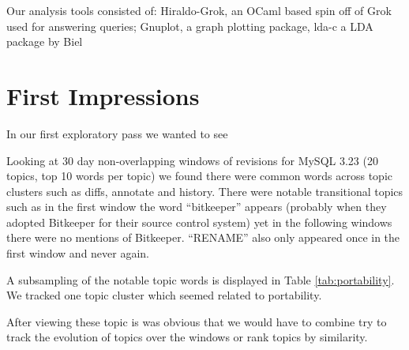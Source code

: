 \documentclass[times, 10pt,twocolumn]{article}
\begin{document}
Our analysis tools consisted of: Hiraldo-Grok, an OCaml based spin off
of Grok used for answering queries; Gnuplot, a graph plotting package,
lda-c a LDA package by Biel









\section{First Impressions}

In our first exploratory pass we wanted to see 

Looking at 30 day non-overlapping windows of revisions for MySQL 3.23
(20 topics, top 10 words per topic) we found there were common words
across topic clusters such as diffs, annotate and history. There were
notable transitional topics such as in the first window the word
``bitkeeper'' appears (probably when they adopted Bitkeeper for their
source control system) yet in the following windows there were no
mentions of Bitkeeper. ``RENAME'' also only appeared once in the first
window and never again.

A subsampling of the notable topic words is displayed in Table
\ref{tab:portability}. We tracked one topic cluster which seemed
related to portability.


After viewing these topic is was obvious that we would have to combine
try to track the evolution of topics over the windows or rank topics
by similarity.

\end{document}
